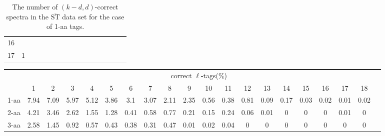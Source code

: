 \documentclass{article}[12pt]
\def\STbar{{\overline{\mathrm{ST}}}}
\begin{document}
\begin{landscape}
\begin{table}[h]
{\begin{tabular}{|c|c|
c|c|c|c|c|c|c|c|c|c|c|c|c|c|}
16  &  &  &  &  &  &  &  &  &  &  &  &  &  &  & \\

17  & 1 &  &  &  &  &  &  &  &  &  &  &  &  &  & \\

  \hline
\end{tabular}
\par}
\centering
\caption{The number of $(k-d,d)$-correct spectra in the $\STbar$ data set for the case of 1-aa tags.}
\vspace{3mm}
\label{table:kd-1-correct-ST-bar}
\end{table}
\end{landscape}


\begin{landscape}

\begin{table}[h]\tiny
\vspace{3mm}
{\centering
\begin{center}
\begin{tabular}{|l|c|c|c|c|c|c|c|c|c|c|c|c|c|c|c|c|c|c|c|}
  \hline
  & \multicolumn{ 18 }{|c|}{correct $\ell$-tags(\%)} \\
  \cline{2- 19}
    & 1 & 2 & 3 & 4 & 5 & 6 & 7 & 8 & 9 & 10 & 11 & 12 & 13 & 14 & 15 & 16 & 17 & 18\\
  \hline
1-aa  & 7.94 & 7.09 & 5.97 & 5.12 & 3.86 & 3.1 & 3.07 & 2.11 & 2.35 & 0.56 & 0.38 & 0.81 & 0.09 & 0.17 & 0.03 & 0.02 & 0.01 & 0.02\\
2-aa  & 4.21 & 3.46 & 2.62 & 1.55 & 1.28 & 0.41 & 0.58 & 0.77 & 0.21 & 0.15 & 0.24 & 0.06 & 0.01 & 0 & 0 & 0 & 0.01 & 0\\
3-aa  & 2.58 & 1.45 & 0.92 & 0.57 & 0.43 & 0.38 & 0.31 & 0.47 & 0.01 & 0.02 & 0.04 & 0 & 0 & 0 & 0 & 0 & 0 & 0\\
 \hline
\end{tabular}
\end{center}
\par}
\centering


\end{table}
\end{landscape}
\end{document}
